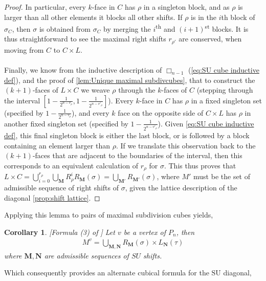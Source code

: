 \documentclass{amsart}
\newtheorem{corollary}[theorem]{Corollary}
\theoremstyle{definition}
\newcommand{\ordinal}{\textsuperscript{th}} %
\newcommand{\ordinalst}{\textsuperscript{st}} %
\newcommand{\SU}{\mathrm{SU}}
\newcommand{\divcube}[1]{\Box_{#1}}
\newcommand{\maxsubdivpairsv}{M^v}
\begin{document}
\begin{proof}
In particular, every $k$-face in $C$ has $\rho$ in a singleton block, and as $\rho$ is larger than all other elements it blocks all other shifts.
If $\rho$ is in the $i$th block of $\sigma_C$, then $\sigma$ is obtained from $\sigma_C$ by merging the $i$\ordinal{} and $(i+1)$\ordinalst{} blocks.
It is thus straightforward to see the maximal right shifts $r_{\rho'}$ are conserved, when moving from $C$ to $C\times L$.
\\\\
Finally, we know from the inductive description of $\divcube{n-1}$ (\cref{eq:SU cube inductive def}), and the proof of \cref{lem:Unique maximal subdivcubes}, that to construct the $(k+1)$-faces of $L\times C$ we weave $\rho$ through the $k$-faces of $C$ (stepping through the interval $[1-\frac{1}{2^{n-v_\rho}},1-\frac{1}{2^{n-v'_\rho}}]$).
Every $k$-face in $C$ has $\rho$ in a fixed singleton set (specified by $1-\frac{1}{2^{n-v_\rho}}$), and every $k$ face on the opposite side of $C\times L$ has $\rho$ in another fixed singleton set (specified by $1-\frac{1}{2^{n-v'_\rho}}$).
Given \cref{eq:SU cube inductive def}, this final singleton block is either the last block, or is followed by a block containing an element larger than $\rho$.
If we translate this observation back to the $(k+1)$-faces that are adjacent to the boundaries of the interval, then this corresponds to an equivalent calculation of $r_\rho$ for $\sigma$.
This thus proves that $L\times C = \bigcup_{i=0}^{r_\rho}\bigcup_{\mathbf{M}}R^i_\rho R_\mathbf{M}(\sigma) = \bigcup_{\mathbf{M'}}R_\mathbf{M'}(\sigma)$, where $M'$ must be the set of admissible sequence of right shifts of $\sigma$, given the lattice description of the diagonal \cref{prop:shift lattice}.

\end{proof}

Applying this lemma to pairs of maximal subdivision cubes yields,

\begin{corollary}\label{prop:Maximal Subdiv Pairs and Shifts}
[Formula (3) of \cite{saneblidzeComparingDiagonalsAssociahedra2022}]
Let $v$ be a vertex of $P_n$, then
\begin{align*}
    \maxsubdivpairsv = \bigcup_{\mathbf{M},\mathbf{N}} R_\mathbf{M}(\sigma) \times L_{\mathbf{N}}(\tau)
\end{align*}
where $\mathbf{M},\mathbf{N}$ are admissible sequences of $SU$ shifts.
\end{corollary}

Which consequently provides an alternate cubical formula for the $\SU$ diagonal,
\end{document}
